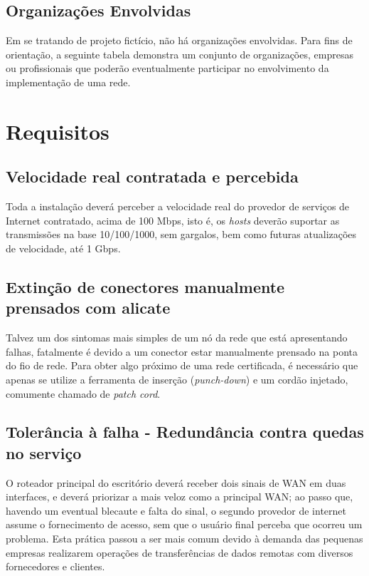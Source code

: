 \documentclass[	DIV=calc,%
							paper=a4,%
							fontsize=12pt,%
							onecolumn]{scrartcl}	 					%
\begin{document}
\subsection{Organizações Envolvidas}
Em se tratando de projeto fictício, não há organizações envolvidas. Para fins de orientação, a seguinte tabela demonstra um conjunto de organizações, empresas ou profissionais que poderão eventualmente participar no envolvimento da implementação de uma rede.\\






\section{Requisitos}

\subsection{Velocidade real contratada e percebida}
Toda a instalação deverá perceber a velocidade real do provedor de serviços de Internet contratado, acima de 100 Mbps, isto é, os \textit{hosts} deverão suportar as transmissões na base 10/100/1000, sem gargalos, bem como futuras atualizações de velocidade, até 1 Gbps.

\subsection{Extinção de conectores manualmente prensados com alicate}
Talvez um dos sintomas mais simples de um nó da rede que está apresentando falhas, fatalmente é devido a um conector estar manualmente prensado na ponta do fio de rede. Para obter algo próximo de uma rede certificada, é necessário que apenas se utilize a ferramenta de inserção (\textit{punch-down}) e um cordão injetado, comumente chamado de \textit{patch cord}.

\subsection{Tolerância à falha - Redundância contra quedas no serviço}
O roteador principal do escritório deverá receber dois sinais de WAN em duas interfaces, e deverá priorizar a mais veloz como a principal WAN; ao passo que, havendo um eventual blecaute e falta do sinal, o segundo provedor de internet assume o fornecimento de acesso, sem que o usuário final perceba que ocorreu um problema. Esta prática passou a ser mais comum devido à demanda das pequenas empresas realizarem operações de transferências de dados remotas com diversos fornecedores e clientes.
\end{document}
